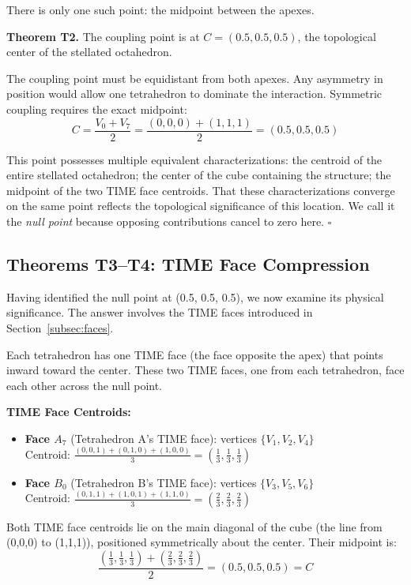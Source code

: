 \documentclass[aps,prd,preprint,superscriptaddress,showpacs,preprintnumbers,amsmath,amssymb,nofootinbib]{revtex4-2}
\begin{document}
There is only one such point: the midpoint between the apexes.

\textbf{Theorem T2.} The coupling point is at $C = (0.5, 0.5, 0.5)$, the topological center of the stellated octahedron.

The coupling point must be equidistant from both apexes. Any asymmetry in position would allow one tetrahedron to dominate the interaction. Symmetric coupling requires the exact midpoint:
\begin{equation}
C = \frac{V_0 + V_7}{2} = \frac{(0,0,0) + (1,1,1)}{2} = (0.5, 0.5, 0.5)
\end{equation}

This point possesses multiple equivalent characterizations: the centroid of the entire stellated octahedron; the center of the cube containing the structure; the midpoint of the two TIME face centroids. That these characterizations converge on the same point reflects the topological significance of this location. We call it the \emph{null point} because opposing contributions cancel to zero here. $\square$

\subsection{Theorems T3--T4: TIME Face Compression}
\label{subsec:theorem-t3-t4}

Having identified the null point at (0.5, 0.5, 0.5), we now examine its physical significance. The answer involves the TIME faces introduced in Section~\ref{subsec:faces}.

Each tetrahedron has one TIME face (the face opposite the apex) that points inward toward the center. These two TIME faces, one from each tetrahedron, face each other across the null point.

\textbf{TIME Face Centroids:}
\begin{itemize}
\item \textbf{Face $A_7$} (Tetrahedron A's TIME face): vertices $\{V_1, V_2, V_4\}$\\
Centroid: $\frac{(0,0,1) + (0,1,0) + (1,0,0)}{3} = (\frac{1}{3}, \frac{1}{3}, \frac{1}{3})$
\item \textbf{Face $B_0$} (Tetrahedron B's TIME face): vertices $\{V_3, V_5, V_6\}$\\
Centroid: $\frac{(0,1,1) + (1,0,1) + (1,1,0)}{3} = (\frac{2}{3}, \frac{2}{3}, \frac{2}{3})$
\end{itemize}

Both TIME face centroids lie on the main diagonal of the cube (the line from (0,0,0) to (1,1,1)), positioned symmetrically about the center. Their midpoint is:
\begin{equation}
\frac{(\frac{1}{3}, \frac{1}{3}, \frac{1}{3}) + (\frac{2}{3}, \frac{2}{3}, \frac{2}{3})}{2} = (0.5, 0.5, 0.5) = C
\end{equation}
\end{document}
